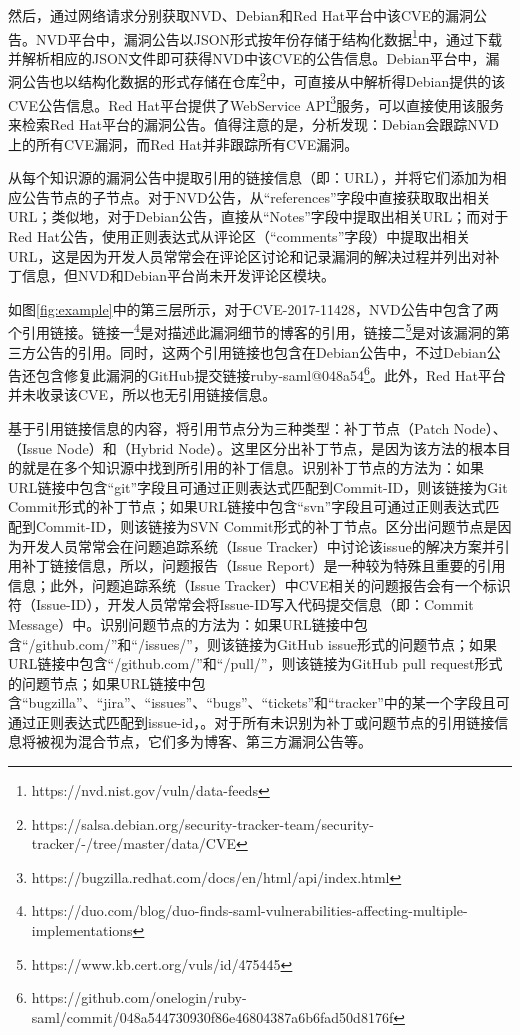 然后，\tool 通过网络请求分别获取NVD、Debian和Red Hat平台中该CVE的漏洞公告。NVD平台中，漏洞公告以JSON形式按年份存储于结构化数据\footnote{https://nvd.nist.gov/vuln/data-feeds}中，\tool 通过下载并解析相应的JSON文件即可获得NVD中该CVE的公告信息。Debian平台中，漏洞公告也以结构化数据的形式存储在仓库\footnote{https://salsa.debian.org/security-tracker-team/security-tracker/-/tree/master/data/CVE}中，\tool 可直接从中解析得Debian提供的该CVE公告信息。Red Hat平台提供了WebService API\footnote{https://bugzilla.redhat.com/docs/en/html/api/index.html}服务，\tool 可以直接使用该服务来检索Red Hat平台的漏洞公告。值得注意的是，分析发现：Debian会跟踪NVD上的所有CVE漏洞，而Red Hat并非跟踪所有CVE漏洞。

\tool 从每个知识源的漏洞公告中提取引用的链接信息（即：URL），并将它们添加为相应公告节点的子节点。对于NVD公告，\tool 从“references”字段中直接获取取出相关URL；类似地，对于Debian公告，\tool 直接从“Notes”字段中提取出相关URL；而对于Red Hat公告，\tool 使用正则表达式从评论区（“comments”字段）中提取出相关URL，这是因为开发人员常常会在评论区讨论和记录漏洞的解决过程并列出对补丁信息，但NVD和Debian平台尚未开发评论区模块。

\begin{exmp}
如图\ref{fig:example}中的第三层所示，对于CVE-2017-11428，NVD公告中包含了两个引用链接。链接一\footnote{https://duo.com/blog/duo-finds-saml-vulnerabilities-affecting-multiple-implementations}是对描述此漏洞细节的博客的引用，链接二\footnote{https://www.kb.cert.org/vuls/id/475445}是对该漏洞的第三方公告的引用。同时，这两个引用链接也包含在Debian公告中，不过Debian公告还包含修复此漏洞的GitHub提交链接ruby-saml@048a54\footnote{https://github.com/onelogin/ruby-saml/commit/048a544730930f86e46804387a6b6fad50d8176f}。此外，Red Hat平台并未收录该CVE，所以也无引用链接信息。
\end{exmp}

\tool 基于引用链接信息的内容，将引用节点分为三种类型：补丁节点（Patch Node）、（Issue Node）和（Hybrid Node）。这里区分出补丁节点，是因为该方法的根本目的就是在多个知识源中找到所引用的补丁信息。识别补丁节点的方法为：如果URL链接中包含“git”字段且可通过正则表达式匹配到Commit-ID，则该链接为Git Commit形式的补丁节点；如果URL链接中包含“svn”字段且可通过正则表达式匹配到Commit-ID，则该链接为SVN Commit形式的补丁节点。区分出问题节点是因为开发人员常常会在问题追踪系统（Issue Tracker）中讨论该issue的解决方案并引用补丁链接信息，所以，问题报告（Issue Report）是一种较为特殊且重要的引用信息；此外，问题追踪系统（Issue Tracker）中CVE相关的问题报告会有一个标识符（Issue-ID），开发人员常常会将Issue-ID写入代码提交信息（即：Commit Message）中。识别问题节点的方法为：如果URL链接中包含“/github.com/”和“/issues/”，则该链接为GitHub issue形式的问题节点；如果URL链接中包含“/github.com/”和“/pull/”，则该链接为GitHub pull request形式的问题节点；如果URL链接中包含“bugzilla”、“jira”、“issues”、“bugs”、“tickets”和“tracker”中的某一个字段且可通过正则表达式匹配到issue-id，。对于所有未识别为补丁或问题节点的引用链接信息将被视为混合节点，它们多为博客、第三方漏洞公告等。

